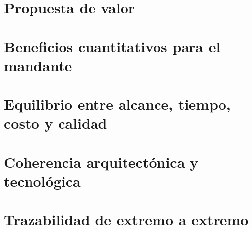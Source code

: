 
\begin{resumenApertura}
\begin{recibe}
  \item {}
\end{recibe}
\end{resumenApertura}

\section{Propuesta de valor}\label{sec:14-propuesta-de-valor}


\section{Beneficios cuantitativos para el mandante}\label{sec:14-beneficios-cuantitativos-para-el}


\section{Equilibrio entre alcance, tiempo, costo y calidad}\label{sec:14-equilibrio-entre-alcance-tiempo-}


\section{Coherencia arquitectónica y tecnológica}\label{sec:14-coherencia-arquitectonica-y-tecn}


\section{Trazabilidad de extremo a extremo}\label{sec:14-trazabilidad-de-extremo-a-extrem}


